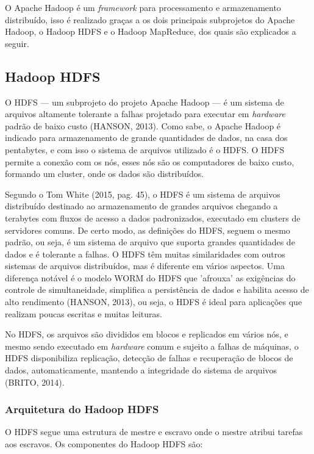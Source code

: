 O Apache Hadoop é um \textit{framework} para processamento e armazenamento distribuído, isso é realizado graças a os dois principais subprojetos do Apache Hadoop, o Hadoop HDFS e o Hadoop MapReduce, dos quais são explicados a seguir.

\subsection{Hadoop HDFS}

O HDFS — um subprojeto do projeto Apache Hadoop — é um sistema de arquivos altamente tolerante a falhas projetado para executar em \textit{hardware} padrão de baixo custo (HANSON, 2013).
Como sabe, o Apache Hadoop é indicado para armazenamento de grande quantidades de dados, na casa dos pentabytes, e com isso o sistema de arquivos utilizado é o HDFS. O HDFS permite a conexão com os nós, esses nós são os computadores de baixo custo, formando um cluster, onde os dados são distribuídos. 

Segundo o Tom White (2015, pag. 45), o HDFS é um sistema de arquivos distribuído destinado ao armazenamento de grandes arquivos chegando a terabytes com fluxos de acesso a dados padronizados, executado em clusters de servidores comuns. De certo modo, as definições do HDFS, seguem o mesmo padrão, ou seja, é um sistema de arquivo que suporta grandes quantidades de dados e é tolerante a falhas. O HDFS têm muitas similaridades com outros sistemas de arquivos distribuídos, mas é diferente em vários aspectos. Uma diferença notável é o modelo WORM do HDFS que 'afrouxa' as exigências do controle de simultaneidade, simplifica a persistência de dados e habilita acesso de alto rendimento (HANSON, 2013), ou seja, o HDFS é ideal para aplicações que realizam poucas escritas e muitas leituras.%

No HDFS, os arquivos são divididos em blocos e replicados em vários nós, e mesmo sendo executado em \textit{hardware} comum e sujeito a falhas de máquinas, o HDFS disponibiliza replicação, detecção de falhas e recuperação de blocos de dados, automaticamente, mantendo a integridade do sistema de arquivos (BRITO, 2014).

\subsubsection{Arquitetura do Hadoop HDFS}

O HDFS segue uma estrutura de mestre e escravo onde o mestre atribui tarefas aos escravos. Os componentes do Hadoop HDFS são:

